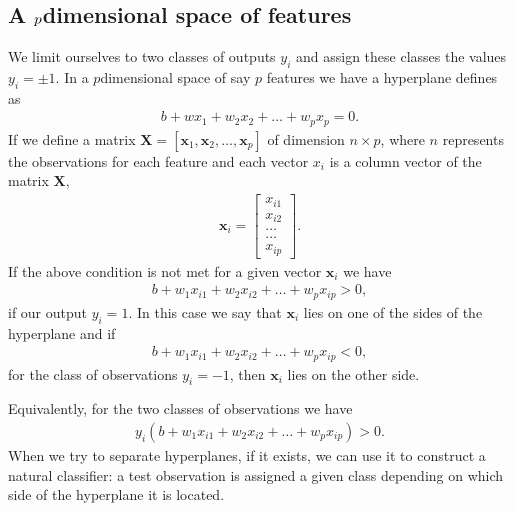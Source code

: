 \documentclass[letterpaper,10pt,english]{sphinxmanual}
\begin{document}
\subsection{A \protect\(p\protect\)\sphinxhyphen{}dimensional space of features}
\label{\detokenize{chapter7:a-p-dimensional-space-of-features}}
We limit ourselves to two classes of outputs \(y_i\) and assign these classes the values \(y_i = \pm 1\).
In a \(p\)\sphinxhyphen{}dimensional space of say \(p\) features we have a hyperplane defines as
\begin{equation*}
\begin{split}
b+wx_1+w_2x_2+\dots +w_px_p=0.
\end{split}
\end{equation*}
If we define a
matrix \(\boldsymbol{X}=\left[\boldsymbol{x}_1,\boldsymbol{x}_2,\dots, \boldsymbol{x}_p\right]\)
of dimension \(n\times p\), where \(n\) represents the observations for each feature and each vector \(x_i\) is a column vector of the matrix \(\boldsymbol{X}\),
\begin{equation*}
\begin{split}
\boldsymbol{x}_i = \begin{bmatrix} x_{i1} \\ x_{i2} \\ \dots \\ \dots \\ x_{ip} \end{bmatrix}.
\end{split}
\end{equation*}
If the above condition is not met for a given vector \(\boldsymbol{x}_i\) we have
\begin{equation*}
\begin{split}
b+w_1x_{i1}+w_2x_{i2}+\dots +w_px_{ip} >0,
\end{split}
\end{equation*}
if our output \(y_i=1\).
In this case we say that \(\boldsymbol{x}_i\) lies on one of the sides of the hyperplane and if
\begin{equation*}
\begin{split}
b+w_1x_{i1}+w_2x_{i2}+\dots +w_px_{ip} < 0,
\end{split}
\end{equation*}
for the class of observations \(y_i=-1\),
then \(\boldsymbol{x}_i\) lies on the other side.

Equivalently, for the two classes of observations we have
\begin{equation*}
\begin{split}
y_i\left(b+w_1x_{i1}+w_2x_{i2}+\dots +w_px_{ip}\right) > 0.
\end{split}
\end{equation*}
When we try to separate hyperplanes, if it exists, we can use it to construct a natural classifier: a test observation is assigned a given class depending on which side of the hyperplane it is located.
\end{document}
